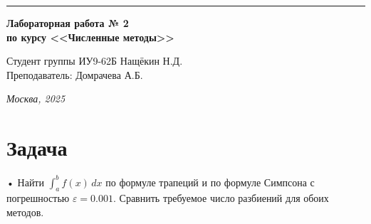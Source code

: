 \documentclass[a4paper, 14pt]{extarticle}
\begin{document}
\begin{titlepage}
\vspace*{-16pt}
\hspace{30pt}\rule{0.866\textwidth}{0.4pt}
  
\vspace{11em}

\begin{center}
\Large {\bf Лабораторная работа № 2} \\ 
\large {\bf по курсу <<Численные методы>>} \\ 
\end{center}\normalsize

\vspace{8em}


\begin{flushright}
  {Студент группы ИУ9-62Б Нащёкин Н.Д.\hspace*{15pt} \\
  \vspace{2ex}
  Преподаватель: Домрачева А.Б.\hspace*{15pt}}
\end{flushright}

\bigskip

\vfill
 

\begin{center}
\textsl{Москва, 2025}
\end{center}
\end{titlepage}

\renewcommand{\ttdefault}{pcr}

\setlength{\tabcolsep}{3pt}
\newpage
\setcounter{page}{2}

\section{Задача}
\begin{justify}
• Найти $\int_a^b f(x)\,dx$ по формуле трапеций и по формуле Симпсона с погрешностью $\varepsilon = 0.001$. Сравнить
требуемое число разбиений для обоих методов.


\end{justify}
\pagebreak
\end{document}
